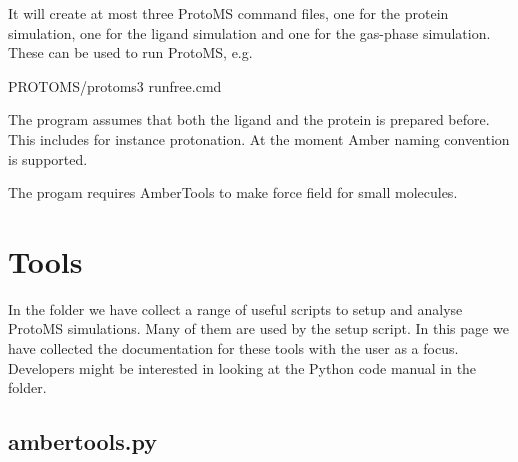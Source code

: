\documentclass[letterpaper,10pt,english]{sphinxmanual}
\begin{document}
It will create at most three ProtoMS command files, one for the protein simulation, one for the ligand simulation and one for the gas-phase simulation. These can be used to run ProtoMS, e.g.

%
\begin{sphinxVerbatim}[commandchars=\\\{\}]
\PYGZdl{}PROTOMS/protoms3 run\PYGZus{}free.cmd
\end{sphinxVerbatim}


The program assumes that both the ligand and the protein is prepared before. This includes for instance protonation. At the moment  Amber naming convention is supported.

The progam requires AmberTools to make force field for small molecules.


\chapter{Tools}
\label{\detokenize{tools:tools}}\label{\detokenize{tools::doc}}
In the  folder we have collect a range of useful scripts to setup and analyse ProtoMS simulations. Many of them are used by the  setup script. In this page we have collected the documentation for these tools with the user as a focus. Developers might be interested in looking at the Python code manual in the  folder.


\section{ambertools.py}
\label{\detokenize{tools:ambertools-py}}

%
\begin{sphinxVerbatim}[commandchars=\\\{\}]
  
    
    
      
\end{sphinxVerbatim}
\end{document}
